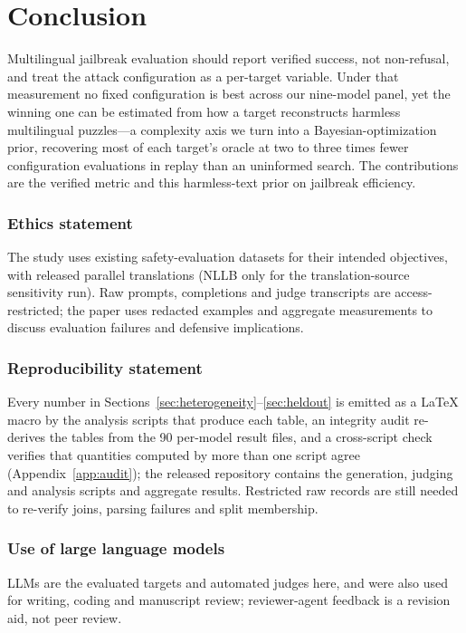 \documentclass{article}
\begin{document}
\section{Conclusion}
Multilingual jailbreak evaluation should report verified success, not non-refusal, and treat the attack configuration as a per-target variable. Under that measurement no fixed configuration is best across our nine-model panel, yet the winning one can be estimated from how a target reconstructs harmless multilingual puzzles---a complexity axis we turn into a Bayesian-optimization prior, recovering most of each target's oracle at two to three times fewer configuration evaluations in replay than an uninformed search. The contributions are the verified metric and this harmless-text prior on jailbreak efficiency.

\subsubsection*{Ethics statement}
The study uses existing safety-evaluation datasets for their intended objectives, with released
parallel translations (NLLB only for the translation-source sensitivity run). Raw prompts,
completions and judge transcripts are access-restricted; the paper uses redacted examples and
aggregate measurements to discuss evaluation failures and defensive implications.

\subsubsection*{Reproducibility statement}
Every number in Sections~\ref{sec:heterogeneity}--\ref{sec:heldout} is emitted as a LaTeX macro by
the analysis scripts that produce each table, an integrity audit re-derives the tables from the 90
per-model result files, and a cross-script check verifies that quantities computed by more than one
script agree (Appendix~\ref{app:audit}); the released repository contains the generation, judging and
analysis scripts and aggregate results. Restricted raw records are still needed to re-verify joins,
parsing failures and split membership.

\subsubsection*{Use of large language models}
LLMs are the evaluated targets and automated judges here, and were also used for writing, coding and
manuscript review; reviewer-agent feedback is a revision aid, not peer review.
\end{document}

